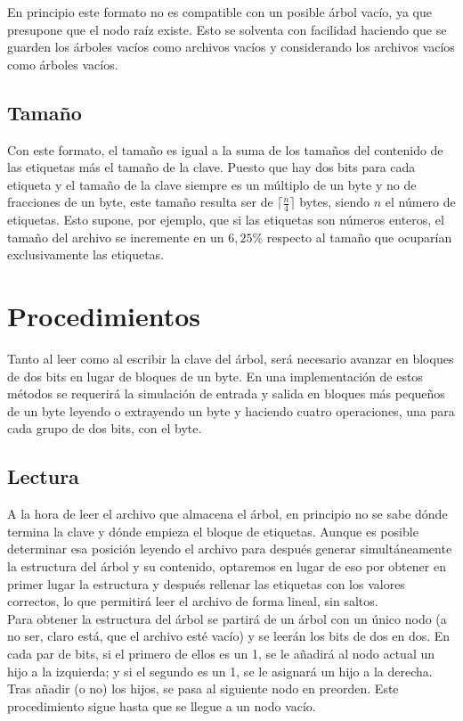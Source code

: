 \documentclass{article}
\begin{document}
En principio este formato no es compatible con un posible árbol vacío, ya que
presupone que el nodo raíz existe. Esto se solventa con facilidad haciendo que se
guarden los árboles vacíos como archivos vacíos y considerando los archivos vacíos
como árboles vacíos.

\subsection{Tamaño}

Con este formato, el tamaño es igual a la suma de los tamaños del contenido de las
etiquetas más el tamaño de la clave. Puesto que hay dos bits para cada etiqueta y
el tamaño de la clave siempre es un múltiplo de un byte y no de fracciones de un
byte, este tamaño resulta ser de $\lceil \frac n 4 \rceil$ bytes, siendo $n$ el
número de etiquetas. Esto supone, por ejemplo, que si las etiquetas son números
enteros, el tamaño del archivo se incremente en un $6,25\%$ respecto al tamaño que
ocuparían exclusivamente las etiquetas.

\section{Procedimientos}

Tanto al leer como al escribir la clave del árbol, será necesario avanzar en
bloques de dos bits en lugar de bloques de un byte. En una implementación de estos
métodos se requerirá la simulación de entrada y salida en bloques más pequeños de
un byte leyendo o extrayendo un byte y haciendo cuatro operaciones, una para cada
grupo de dos bits, con el byte.

\subsection{Lectura}

A la hora de leer el archivo que almacena el árbol, en principio no se sabe dónde
termina la clave y dónde empieza el bloque de etiquetas. Aunque es posible
determinar esa posición leyendo el archivo para después generar simultáneamente la
estructura del árbol y su contenido, optaremos en lugar de eso por obtener en
primer lugar la estructura y después rellenar las etiquetas con los valores
correctos, lo que permitirá leer el archivo de forma lineal, sin saltos. \\

Para obtener la estructura del árbol se partirá de un árbol con un único nodo (a
no ser, claro está, que el archivo esté vacío) y se leerán los bits de dos en dos.
En cada par de bits, si el primero de ellos es un 1, se le añadirá al nodo actual
un hijo a la izquierda; y si el segundo es un 1, se le asignará un hijo a la
derecha. Tras añadir (o no) los hijos, se pasa al siguiente nodo en preorden. Este
procedimiento sigue hasta que se llegue a un nodo vacío. \\
\end{document}

